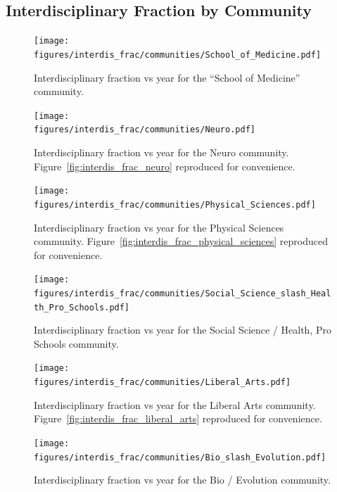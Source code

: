 \documentclass[notitlepage,aps,prd,nofootinbib]{revtex4-1}
\newcommand{\figures}{../outputs/plots}
\begin{document}
\begin{appendices}
\section{Interdisciplinary Fraction by Community}
\label{appendix:interdis_frac_community}

\begin{figure}[!htb]\centering
  \texttt{[image: \\figures/interdis\_frac/communities/School\_of\_Medicine.pdf]}
  \caption{Interdisciplinary fraction vs year for the ``School of Medicine'' community.}
\end{figure}

\begin{figure}[!htb]\centering
  \texttt{[image: \\figures/interdis\_frac/communities/Neuro.pdf]}
  \caption{Interdisciplinary fraction vs year for the Neuro community. Figure~\ref{fig:interdis_frac_neuro} reproduced for convenience.}
\end{figure}

\begin{figure}[!htb]\centering
  \texttt{[image: \\figures/interdis\_frac/communities/Physical\_Sciences.pdf]}
  \caption{Interdisciplinary fraction vs year for the Physical Sciences community. Figure~\ref{fig:interdis_frac_physical_sciences} reproduced for convenience.}
\end{figure}

\begin{figure}[!htb]\centering
  \texttt{[image: \\figures/interdis\_frac/communities/Social\_Science\_slash\_Health\_Pro\_Schools.pdf]}
  \caption{Interdisciplinary fraction vs year for the Social Science / Health, Pro Schools community.}
\end{figure}

\begin{figure}[!htb]\centering
  \texttt{[image: \\figures/interdis\_frac/communities/Liberal\_Arts.pdf]}
  \caption{Interdisciplinary fraction vs year for the Liberal Arts community. Figure~\ref{fig:interdis_frac_liberal_arts} reproduced for convenience.}
\end{figure}

\begin{figure}[!htb]\centering
  \texttt{[image: \\figures/interdis\_frac/communities/Bio\_slash\_Evolution.pdf]}
  \caption{Interdisciplinary fraction vs year for the Bio / Evolution community.}
\end{figure}



\end{appendices}
\end{document}
